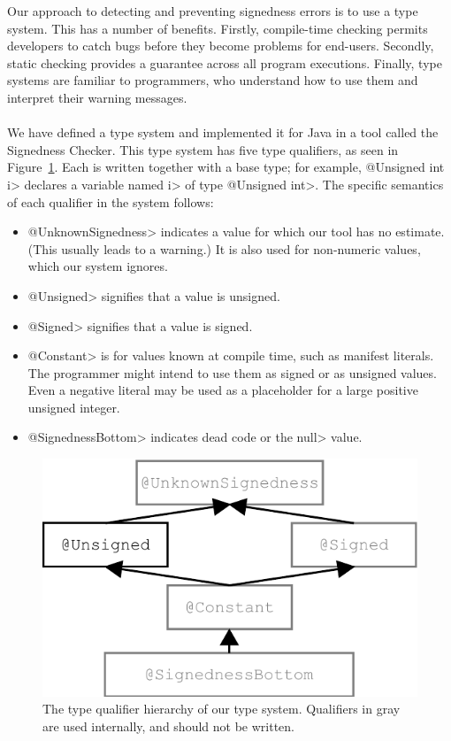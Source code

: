 Our approach to detecting and preventing signedness errors is to use a type
system. This has a number of benefits. Firstly, compile-time checking permits
developers
to catch bugs before they become problems for end-users. Secondly, static
checking provides a guarantee across all program executions.
Finally, type systems are familiar to programmers,
who understand how to use them
and interpret their warning messages.\\
\\
We have defined a type system and implemented it for Java in a tool
called the Signedness Checker.
This type system has five type qualifiers, as seen in
Figure~\ref{fig:type-hierarchy}.  Each is written together
with a base type; for example, \<@Unsigned int i> declares a
variable named \<i> of type \<@Unsigned int>. The specific semantics of
each qualifier in the system follows:

\begin{itemize}
  \item \<@UnknownSignedness> indicates a value for which our tool
   has no estimate.  (This usually leads to a
    warning.)  It is also used for non-numeric
    values, which our system ignores.
  \item \<@Unsigned> signifies that a value is unsigned.
  \item \<@Signed> signifies that a value is signed.
  \item \<@Constant> is for values known at compile time, such as
    manifest literals.  The programmer might intend to
    use them as signed or as unsigned values.  Even a negative literal may
    be used as a placeholder for a large positive unsigned
    integer.
  \item \<@SignednessBottom> indicates dead code or the \<null> value.
\end{itemize}

\begin{figure}[t]
\centering
\includegraphics{signedness}
\caption{The type qualifier hierarchy of our type system.
Qualifiers in gray are used internally, and should not be written.}
\label{fig:type-hierarchy}
\end{figure}

